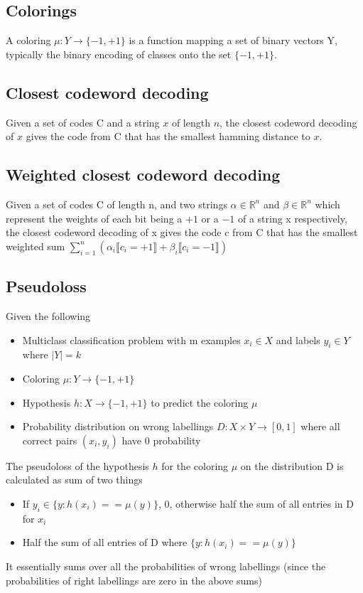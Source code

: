 \documentclass[11pt]{article}
\begin{document}
    \subsection{Colorings}
        A coloring $\mu : Y \rightarrow \{-1, +1\}$ is a function mapping a set of binary vectors Y, typically the binary encoding of classes onto the set $\{-1,+1\}$.
    \subsection{Closest codeword decoding}
    Given a set of codes C and a string $x$ of length $n$, the closest codeword decoding of $x$ gives the code from C that has the smallest hamming distance to $x$.
    \subsection{Weighted closest codeword decoding}
    Given a set of codes C of length n, and two strings $\alpha \in \mathbb{R}^n$ and $\beta \in \mathbb{R}^n$ which represent the weights of each bit being a $+1$ or a $-1$ of a string x respectively, the closest codeword decoding of x gives the code c from C that has the smallest weighted sum $\sum_{i=1}^n (\alpha_i\llbracket c_i = +1 \rrbracket + \beta_i\llbracket c_i = -1 \rrbracket)$
    \subsection{Pseudoloss}
    Given the following
    \begin{itemize}
    \item Multiclass classification problem with m examples $x_i \in X$ and labels $y_i \in Y$ where $|Y| = k$
    \item Coloring $\mu : Y \rightarrow \{-1,+1\}$
    \item Hypothesis $h: X \rightarrow \{-1,+1\}$ to predict the coloring $\mu$
    \item Probability distribution on wrong labellings $D : X \times Y \rightarrow [0,1]$ where all correct pairs $(x_i, y_i)$ have 0 probability
    \end{itemize}
    The pseudoloss of the hypothesis $h$ for the coloring $\mu$ on the distribution D is calculated as sum of two things
    \begin{itemize}
    \item If $y_i \in \{y : h(x_i) == \mu(y) \}$, 0, otherwise half the sum of all entries in D for $x_i$
    \item Half the sum of all entries of D where $\{y : h(x_i) == \mu(y) \}$
    \end{itemize}
    It essentially sums over all the probabilities of wrong labellings (since the probabilities of right labellings are zero in the above sums)
\end{document}
